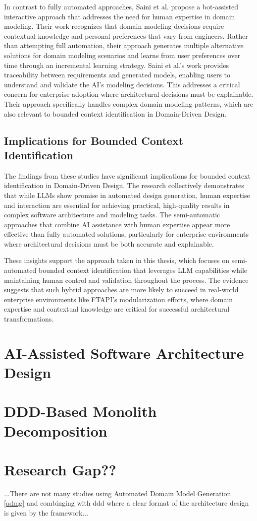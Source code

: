 In contrast to fully automated approaches, Saini et al. \autocite{Saini2022} propose a bot-assisted interactive approach that addresses the need for human expertise in domain modeling. Their work recognizes that domain modeling decisions require contextual knowledge and personal preferences that vary from engineers. Rather than attempting full automation, their approach generates multiple alternative solutions for domain modeling scenarios and learns from user preferences over time through an incremental learning strategy. Saini et al.'s work provides traceability between requirements and generated models, enabling users to understand and validate the AI's modeling decisions. This addresses a critical concern for enterprise adoption where architectural decisions must be explainable. Their approach specifically handles complex domain modeling patterns, which are also relevant to bounded context identification in Domain-Driven Design.

\subsection{Implications for Bounded Context Identification}

The findings from these studies have significant implications for bounded context identification in Domain-Driven Design. The research collectively demonstrates that while LLMs show promise in automated design generation, human expertise and interaction are essential for achieving practical, high-quality results in complex software architecture and modeling tasks. The semi-automatic approaches that combine AI assistance with human expertise appear more effective than fully automated solutions, particularly for enterprise environments where architectural decisions must be both accurate and explainable.

These insights support the approach taken in this thesis, which focuses on semi-automated bounded context identification that leverages LLM capabilities while maintaining human control and validation throughout the process. The evidence suggests that such hybrid approaches are more likely to succeed in real-world enterprise environments like FTAPI's modularization efforts, where domain expertise and contextual knowledge are critical for successful architectural transformations.

\section{AI-Assisted Software Architecture Design}
\section{DDD-Based Monolith Decomposition}

\section{Research Gap??}
...There are not many studies using Automated Domain Model Generation \ref{admg} and combinging with ddd where a clear format of the architecture design is given by the framework...